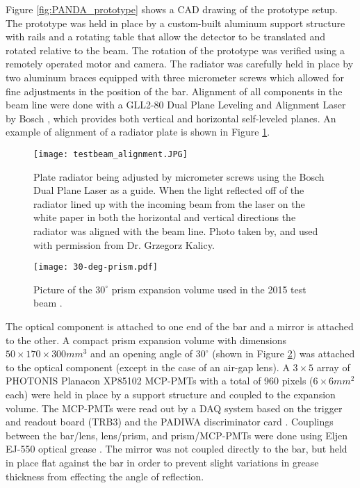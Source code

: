 Figure \ref{fig:PANDA_prototype} shows a CAD drawing of the prototype setup. The prototype was held in place by a custom-built aluminum support structure with rails and a rotating table that allow the detector to be translated and rotated relative to the beam. The rotation of the prototype was verified using a remotely operated motor and camera. The radiator was carefully held in place by two aluminum braces equipped with three micrometer screws which allowed for fine adjustments in the position of the bar. Alignment of all components in the beam line were done with a GLL2-80 Dual Plane Leveling and Alignment Laser by Bosch \cite{BoschLaser}, which provides both vertical and horizontal self-leveled planes. An example of alignment of a radiator plate is shown in Figure \ref{fig:testbeam_alignment}. 

\begin{figure}[!htb]
	\centering
	\texttt{[image: testbeam\_alignment.JPG]}
	\caption[Plate radiator being adjusted by micrometer screws using the Bosch Dual Plane Laser as a guide.]{Plate radiator being adjusted by micrometer screws using the Bosch Dual Plane Laser as a guide. When the light reflected off of the radiator lined up with the incoming beam from the laser on the white paper in both the horizontal and vertical directions the radiator was aligned with the beam line. Photo taken by, and used with permission from Dr. Grzegorz Kalicy.}
	\label{fig:testbeam_alignment}
\end{figure}

\begin{figure}[!htb]
	\centering
	\texttt{[image: 30-deg-prism.pdf]}
	\caption[Picture of the $30^{\circ}$ prism expansion volume used in the 2015 test beam.]{Picture of the $30^{\circ}$ prism expansion volume used in the 2015 test beam \cite{PrototypeInfo}.}
	\label{fig:prototype_prism}
\end{figure}

The optical component is attached to one end of the bar and a mirror is attached to the other. A compact prism expansion volume with dimensions $50\times170\times300\unit{mm}^3$ and an opening angle of $30^\circ$ (shown in Figure \ref{fig:prototype_prism}) was attached to the optical component (except in the case of an air-gap lens). A $3\times5$ array of PHOTONIS Planacon XP85102 MCP-PMTs with a total of 960 pixels ($6\times6\unit{mm}^2$ each) were held in place by a support structure and coupled to the expansion volume. The MCP-PMTs were read out by a DAQ system based on the trigger and readout board (TRB3) and the PADIWA discriminator card \cite{PANDA_electronics}. Couplings between the bar/lens, lens/prism, and prism/MCP-PMTs were done using Eljen EJ-550 optical grease \cite{EljenTech}. The mirror was not coupled directly to the bar, but held in place flat against the bar in order to prevent slight variations in grease thickness from effecting the angle of reflection.

